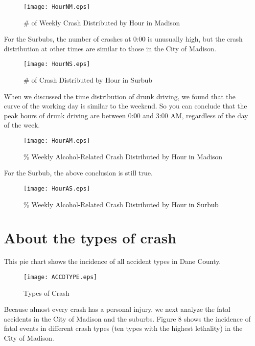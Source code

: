 \documentclass[10pt]{article}
\begin{document}
\begin{figure}[H]
\flushleft
\texttt{[image: HourNM.eps]}
\caption{\# of Weekly Crash Distributed by Hour in Madison}
\label{11}
\end{figure}

\newpage
For the Surbubs, the number of crashes at 0:00 is unusually high, but the crash distribution at other times are similar to those in the City of Madison. 

\begin{figure}[H]
\flushleft
\texttt{[image: HourNS.eps]}
\caption{\# of Crash Distributed by Hour in Surbub}
\label{12}
\end{figure}

\newpage
When we discussed the time distribution of drunk driving, we found that the curve of the working day is similar to the weekend. So you can conclude that the peak hours of drunk driving are between 0:00 and 3:00 AM, regardless of the day of the week.

\begin{figure}[H]
\flushleft
\texttt{[image: HourAM.eps]}
\caption{\% Weekly Alcohol-Related Crash Distributed by Hour in Madison}
\label{13}
\end{figure}

\newpage
For the Surbub, the above conclusion is still true.

\begin{figure}[H]
\flushleft
\texttt{[image: HourAS.eps]}
\caption{\% Weekly Alcohol-Related Crash Distributed by Hour in Surbub}
\label{14}
\end{figure}

\newpage
\section{About the types of crash}

This pie chart shows the incidence of all accident types in Dane County.

\begin{figure}[H]
\flushleft
\texttt{[image: ACCDTYPE.eps]}
\caption{Types of Crash}
\label{15}
\end{figure}

\newpage
Because almost every crash has a personal injury, we next analyze the fatal accidents in the City of Madison and the suburbs.
Figure 8 shows the incidence of fatal events in different crash types (ten types with the highest lethality) in the City of Madison.
\end{document}
